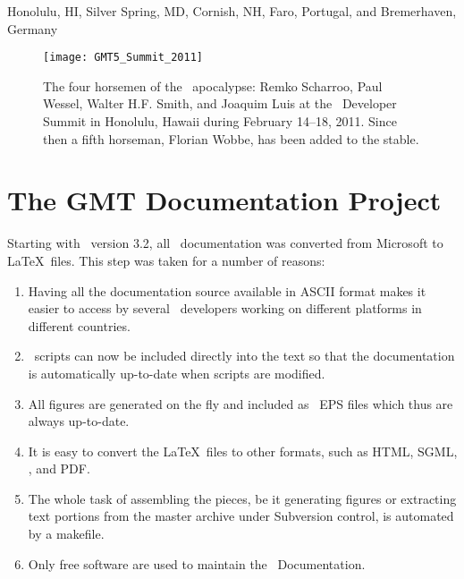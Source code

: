 \begin{flushright}
Honolulu, HI, Silver Spring, MD, Cornish, NH, Faro, Portugal, and Bremerhaven, Germany \GMTDOCDATE
\end{flushright}

\noindent
\begin{figure}[H]
	\centering
	\texttt{[image: GMT5\_Summit\_2011]}
	\caption{The four horsemen of the \GMT\ apocalypse: Remko Scharroo, Paul Wessel,
	Walter H.F. Smith, and Joaquim Luis at the \GMT\ Developer Summit in Honolulu,
	Hawaii during February 14--18, 2011.  Since then a fifth horseman, Florian Wobbe, has
	been added to the stable.}
\end{figure}


\chapter*{The GMT Documentation Project}

Starting with \GMT\ version 3.2, all \GMT\ documentation was
converted from Microsoft  to \LaTeX\ files.
This step was taken for a number of reasons:

\begin{enumerate}

\item Having all the documentation source available in
ASCII format makes it easier to access by several
\GMT\ developers working on different platforms in 
different countries.

\item \GMT\ scripts can now be included directly into the text
so that the documentation is automatically up-to-date
when scripts are modified.

\item All figures are generated on the fly and included as
\GMT\ EPS files which thus are always up-to-date.

\item It is easy to convert the \LaTeX\ files to other
formats, such as HTML, SGML, \PS, and PDF.

\item The whole task of assembling the pieces, be it generating
figures or extracting text portions from the master archive under
Subversion control, is automated by a makefile.

\item Only free software are used to maintain the \GMT\ Documentation.

\end{enumerate}

